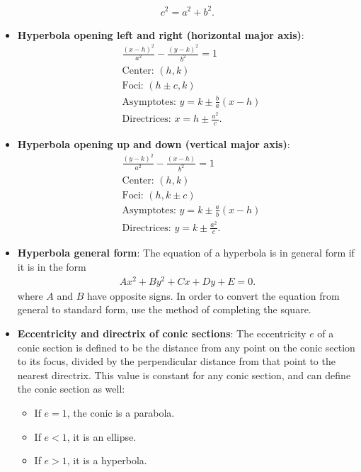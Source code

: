 \documentclass{report}
\begin{document}
\begin{itemize}
\begin{align*}
            c^{2} = a^{2} + b^{2}
        .\end{align*}
    \item \textbf{Hyperbola opening left and right (horizontal major axis)}:
        \begin{align*}
            &\frac{(x-h)^{2}}{a^{2}} - \frac{(y-k)^{2}}{b^{2}} = 1 \\
            &\text{Center: } (h,k) \\
            &\text{Foci: } (h\pm c, k) \\
            &\text{Asymptotes: } y= k\pm \frac{b}{a}(x-h) \\
            &\text{Directrices: } x=h\pm \frac{a^{2}}{c}
        .\end{align*}
    \item \textbf{Hyperbola opening up and down (vertical major axis)}:
        \begin{align*}
            &\frac{(y-k)^{2}}{a^{2}} - \frac{(x-h)}{b^{2}} = 1 \\
            &\text{Center: } (h,k) \\
            &\text{Foci: } (h, k\pm c) \\
            &\text{Asymptotes: } y= k\pm \frac{a}{b}(x-h) \\
            &\text{Directrices: } y=k\pm \frac{a^{2}}{c}
        .\end{align*}
    \item \textbf{Hyperbola general form}: The equation of a hyperbola is in general form if it is in the form  
        \begin{align*}
            Ax^{2} + By^{2} + Cx + Dy + E = 0
        .\end{align*}
        \bigbreak \noindent 
      where $A$ and $B$ have opposite signs. In order to convert the equation from general to standard form, use the method of completing the square.
    \item \textbf{Eccentricity and directrix of conic sections}:
    The eccentricity $e$ of a conic section is defined to be the distance from any point on the conic section to its focus, divided by the perpendicular distance from that point to the nearest directrix. This value is constant for any conic section, and can define the conic section as well:
    \begin{itemize}
        \item If $e=1$, the conic is a parabola.
        \item If $e<1$, it is an ellipse.
        \item If $e>1$, it is a hyperbola.

\end{itemize}
\end{itemize}
\end{document}
